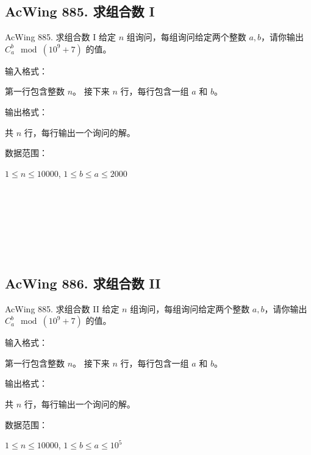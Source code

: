 \subsection{AcWing 885. 求组合数 I}
\begin{titledbox}{AcWing 885. 求组合数 I}
    给定 $n$ 组询问，每组询问给定两个整数 $a, b$，请你输出 $C_a^b \mod (10^9 + 7)$ 的值。

    输入格式：

    第一行包含整数 $n$。 接下来 $n$ 行，每行包含一组 $a$ 和 $b$。

    输出格式：

    共 $n$ 行，每行输出一个询问的解。

    数据范围：

    $1 \le n \le 10000$, $1 \le b \le a \le 2000$

    \begin{inputblock}
         \\
         \\
         \\
    \end{inputblock}
    \begin{outputblock}
         \\
         \\
    \end{outputblock}
\end{titledbox}

\subsection{AcWing 886. 求组合数 II}

\begin{titledbox}{AcWing 885. 求组合数 II}
    给定 $n$ 组询问，每组询问给定两个整数 $a, b$，请你输出 $C_a^b \mod (10^9 + 7)$ 的值。

    输入格式：

    第一行包含整数 $n$。 接下来 $n$ 行，每行包含一组 $a$ 和 $b$。

    输出格式：

    共 $n$ 行，每行输出一个询问的解。

    数据范围：

    $1 \le n \le 10000$, $1 \le b \le a \le 10^5$

    \begin{inputblock}
         \\
         \\
         \\
    \end{inputblock}
    \begin{outputblock}
         \\
         \\
    \end{outputblock}
\end{titledbox}

